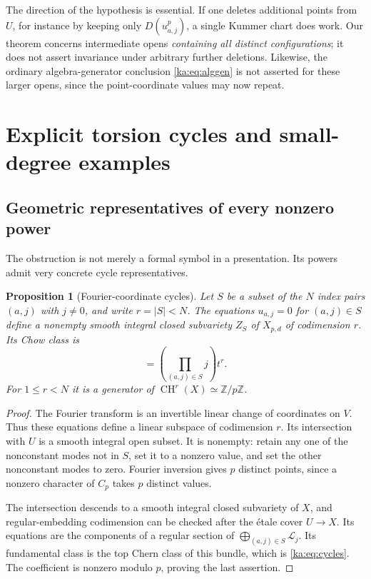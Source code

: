 \documentclass[11pt,a4paper]{article}
\newtheorem{proposition}[theorem]{Proposition}
\theoremstyle{definition}
\theoremstyle{remark}
\newcommand{\Z}{\mathbb Z}
\newcommand{\LL}{\mathcal L}
\newcommand{\CH}{\operatorname{CH}}
\begin{document}
The direction of the hypothesis is essential. If one deletes additional
points from $U$, for instance by keeping only $D(u_{a,j}^p)$, a single
Kummer chart does work. Our theorem concerns intermediate opens
\emph{containing all distinct configurations}; it does not assert
invariance under arbitrary further deletions. Likewise, the ordinary
algebra-generator conclusion \eqref{ka:eq:alggen} is not asserted for these
larger opens, since the point-coordinate values may now repeat.

\section{Explicit torsion cycles and small-degree examples}
\label{ka:sec:cycles}

\subsection{Geometric representatives of every nonzero power}
The obstruction is not merely a formal symbol in a presentation. Its
powers admit very concrete cycle representatives.

\begin{proposition}[Fourier-coordinate cycles]
\label{ka:prop:cycles}
Let $S$ be a subset of the $N$ index pairs $(a,j)$ with $j\neq0$, and
write $r=|S|<N$. The equations $u_{a,j}=0$ for $(a,j)\in S$ define a
nonempty smooth integral closed subvariety $Z_S$ of $X_{p,d}$ of
codimension $r$. Its Chow class is
\begin{equation}
 [Z_S]=\left(\prod_{(a,j)\in S}j\right)t^r.
 \label{ka:eq:cycles}
\end{equation}
For $1\leq r<N$ it is a generator of $\CH^r(X)\simeq\Z/p\Z$.
\end{proposition}
\begin{proof}
The Fourier transform is an invertible linear change of coordinates on
$V$. Thus these equations define a linear subspace of codimension $r$.
Its intersection with $U$ is a smooth integral open subset. It is
nonempty: retain any one of the nonconstant modes not in $S$, set it
to a nonzero value, and set the other nonconstant modes to zero.
Fourier inversion gives $p$ distinct points, since a nonzero character
of $C_p$ takes $p$ distinct values.

The intersection descends to a smooth integral closed subvariety of
$X$, and regular-embedding codimension can be checked after the \'etale
cover $U\to X$. Its equations are the components of a regular section
of $\bigoplus_{(a,j)\in S}\LL_j$. Its fundamental class is the top
Chern class of this bundle, which is \eqref{ka:eq:cycles}. The coefficient
is nonzero modulo $p$, proving the last assertion.
\end{proof}
\end{document}
